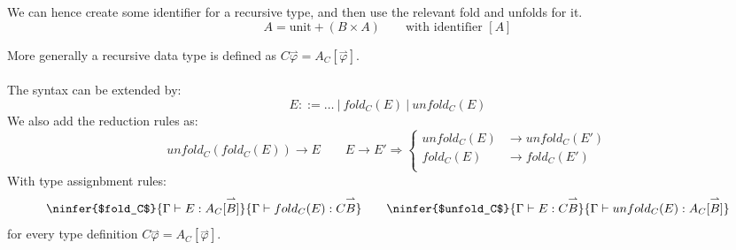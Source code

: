 We can hence create some identifier for a recursive type, and then use the relevant fold and unfolds for it.
\[A = \text{unit} + (B \times A) \qquad \text{with identifier } [A]\]

More generally a recursive data type is defined as $C \overset{\rightharpoonup}{\varphi} = A_C[\overset{\rightharpoonup}{\varphi}]$.
\\
\\ The syntax can be extended by:
\[E ::= \dots \ | \ fold_C(E) \ | \ unfold_C(E)\]
We also add the reduction rules as:
\[unfold_C(fold_C(E)) \to E \qquad E \to E' \Rightarrow \begin{cases}
    unfold_C(E) & \to unfold_C(E') \\
    fold_C(E) & \to fold_C(E') \\
\end{cases}\]
With type assignbment rules:
\[\ninfer{$fold_C$}{
    \Gamma \vdash E : A_C[\overset{\rightharpoonup}{B}]
}{
    \Gamma \vdash fold_C(E) : C \overset{\rightharpoonup}{B}
} \qquad \ninfer{$unfold_C$}{
    \Gamma \vdash E : C \overset{\rightharpoonup}{B}
}{
    \Gamma \vdash unfold_C(E) : A_C[\overset{\rightharpoonup}{B}]
}\]
for every type definition $C \overset{\rightharpoonup}{\varphi} = A_C[\overset{\rightharpoonup}{\varphi}]$.

